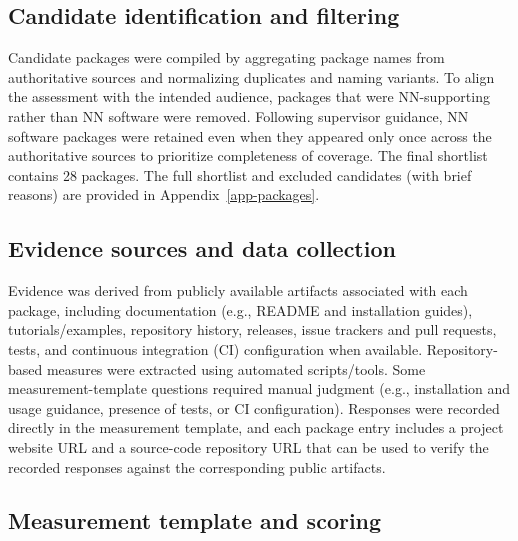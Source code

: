 \documentclass[final,1p,times,authoryear,12pt]{elsarticle}
\providecommand{\wss}[1]{\textcolor{blue}{\textit{#1}}}
\begin{document}
\subsection{Candidate identification and filtering}\label{filtering}

 Candidate packages were compiled by aggregating package names from authoritative sources and normalizing duplicates 
 and naming variants. To align the assessment with the intended audience, packages that were NN-supporting rather than NN software 
 were removed. Following supervisor guidance, NN software packages were retained even when they appeared only once across the
  authoritative sources to prioritize completeness of coverage. The final shortlist contains 28 packages. 
  The full shortlist and excluded candidates (with brief reasons) are provided in Appendix~\ref{app-packages}.

\subsection{Evidence sources and data collection}\label{data}

Evidence was derived from publicly available artifacts associated with each package, 
including documentation (e.g., README and installation guides), tutorials/examples, 
repository history, releases, issue trackers and pull requests, tests, and continuous integration (CI) configuration when available. 
Repository-based measures were extracted using automated scripts/tools. Some measurement-template questions required manual
 judgment (e.g., installation and usage guidance, presence of tests, or CI configuration). 
 Responses were recorded directly in the measurement template, and each package entry includes a project website URL and a source-code 
 repository URL that can be used to verify the recorded responses against the corresponding public artifacts.

\subsection{Measurement template and scoring}\label{template}
\end{document}

